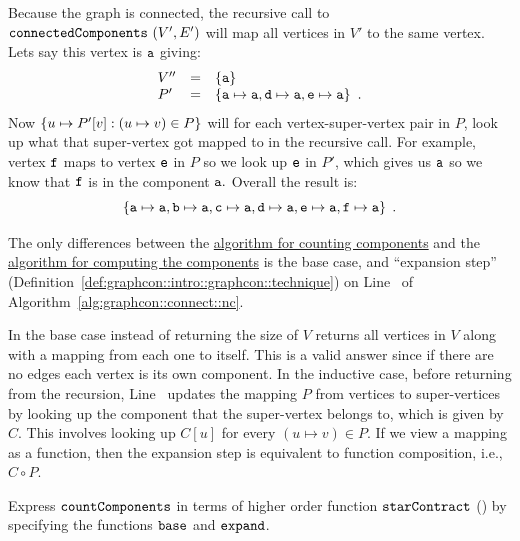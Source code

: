 \begin{flex}
\begin{example}
Because the graph is connected, the recursive call to
$\texttt{connectedComponents}~(V',E')$ will map all vertices in $V'$ to
the same vertex.  Lets say this vertex is $\texttt{a}$ giving:
\[
\begin{array}{lcl}
V'' & = & \left\{ \texttt{a} \right\}\\
P' & = & \left\{ \texttt{a} \mapsto \texttt{a}, \texttt{d} \mapsto \texttt{a}, \texttt{e} \mapsto \texttt{a} \right\}~.
\end{array}
\]
%
Now $\left\{ u \mapsto P'[v] : (u \mapsto v) \in P \right\}$ will for each
vertex-super-vertex pair in $P$, look up what that super-vertex got
mapped to in the recursive call.  For example, vertex $\texttt{f}$ maps
to vertex $\texttt{e}$ in $P$ so we look up $\texttt{e}$ in $P'$, which
gives us $\texttt{a}$ so we know that $\texttt{f}$ is in the component
$\texttt{a}.$  Overall the result is:
%
\[\left\{ \texttt{a} \mapsto \texttt{a}, 
                          \texttt{b} \mapsto \texttt{a}, 
                          \texttt{c} \mapsto \texttt{a}, 
                          \texttt{d} \mapsto \texttt{a}, 
                          \texttt{e} \mapsto \texttt{a}, 
                          \texttt{f} \mapsto \texttt{a} \right\}\;.\]
\end{example}
\end{flex}

\begin{note}
The only differences between the 
%
\href{alg:graphcon::connect::cc}{algorithm for counting components}
%
and the
%
\href{alg:graphcon::connect::nc}{algorithm for computing the components}
%
is the base case, and ``expansion step'' 
(Definition~\ref{def:graphcon::intro::graphcon::technique})
%
on Line~\linegcncback{} of Algorithm~\ref{alg:graphcon::connect::nc}.
%

In the base case instead of returning the size of $V$
returns all vertices in $V$ along with a mapping from each one to
itself.  This is a valid answer since if there are no edges each
vertex is its own component.  
%
In the inductive case, before returning
from the recursion, Line~\linegcncback{} updates the mapping $P$ from
vertices to super-vertices by looking up the component that the
super-vertex belongs to, which is given by $C$. 
%
This involves looking up $C[u]$ for every $(u \mapsto v) \in P$.  
%
If we view a mapping as a function, then the expansion step is equivalent to function composition, i.e., $C \circ P$.
\end{note}

\begin{exercise}
Express $\texttt{countComponents}$ in terms of higher order function
$\texttt{starContract}$ () by
specifying the functions $\texttt{base}$ and $\texttt{expand}$.
\end{exercise}


